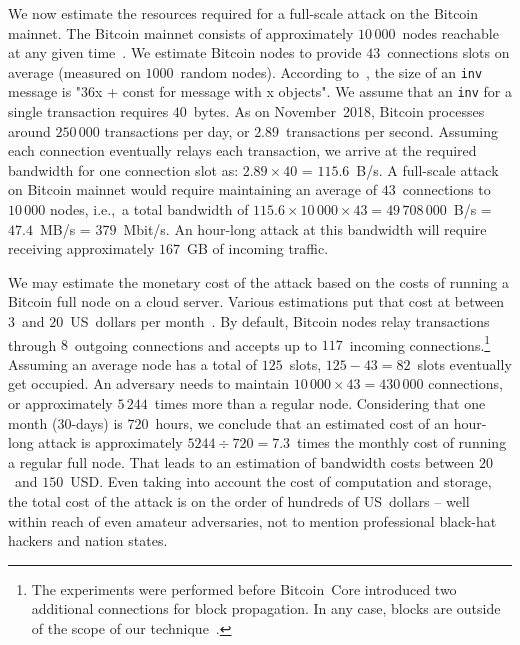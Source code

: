 We now estimate the resources required for a full-scale attack on the Bitcoin mainnet.
The Bitcoin mainnet consists of approximately $10\,000$~nodes reachable at any given time~\cite{Bitnodes}.
We estimate Bitcoin nodes to provide $43$~connections slots on average (measured on $1000$~random nodes).
According to~\cite{BitcoinWiki}, the size of an \texttt{inv} message is "36x + const for message with x objects".
We assume that an \texttt{inv} for a single transaction requires $40$~bytes.
As on November~2018, Bitcoin processes around $250\,000$ transactions per day, or $2.89$~transactions per second.
Assuming each connection eventually relays each transaction, we arrive at the required bandwidth for one connection slot as: $2.89 \times 40$ = $115.6$~B/s.
A full-scale attack on Bitcoin mainnet would require maintaining an average of $43$~connections to $10\,000$ nodes, i.e.,~a total bandwidth of $115.6 \times 10\,000 \times 43 = 49\,708\,000$~B/s = $47.4$~MB/s = $379$~Mbit/s.
An hour-long attack at this bandwidth will require receiving approximately $167$~GB of incoming traffic.

We may estimate the monetary cost of the attack based on the costs of running a Bitcoin full node on a cloud server.
Various estimations put that cost at between $3$~and $20$~US~dollars per month~\cite{Zeyde2018, Connell2017}.
By default, Bitcoin nodes relay transactions through $8$~outgoing connections and accepts up to $117$~incoming connections.\footnote{The experiments were performed before Bitcoin~Core introduced two additional connections for block propagation. In any case, blocks are outside of the scope of our technique~\cite{Daftuar2019}.}
Assuming an average node has a total of $125$~slots, $125 - 43 = 82$~slots eventually get occupied.
An adversary needs to maintain $10\,000 \times 43 = 430\,000$ connections, or approximately $5\,244$~times more than a regular node.
Considering that one month ($30$-days) is $720$~hours, we conclude that an estimated cost of an hour-long attack is approximately $5244 \div 720 = 7.3$~times the monthly cost of running a regular full node.
That leads to an estimation of bandwidth costs between $20$~and $150$~USD.
Even taking into account the cost of computation and storage, the total cost of the attack is on the order of hundreds of US~dollars -- well within reach of even amateur adversaries, not to mention professional black-hat hackers and nation states.

